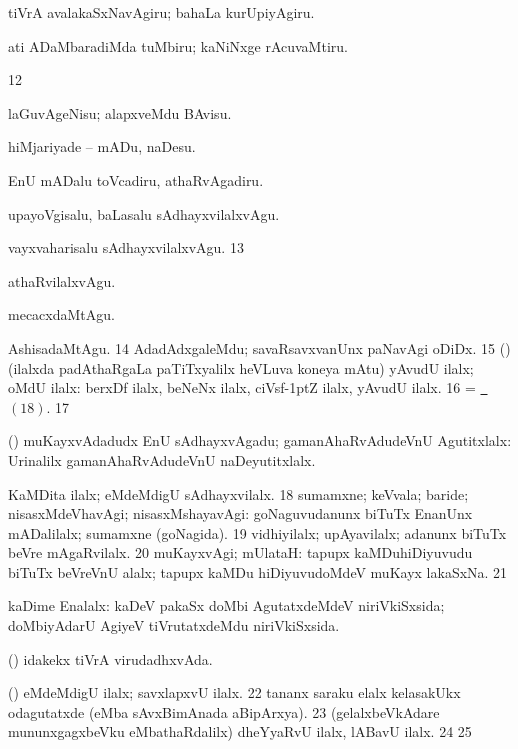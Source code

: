 { tiVrA avalakaSxNavAgiru; bahaLa kurUpiyAgiru.

 ati ADaMbaradiMda tuMbiru; kaNiNxge rAcuvaMtiru.

\num{12} 

 laGuvAgeNisu; alapxveMdu BAvisu.

 hiMjariyade -- mADu, naDesu.

 EnU mADalu toVcadiru, athaRvAgadiru.

 upayoVgisalu, baLasalu sAdhayxvilalxvAgu.

 vayxvaharisalu sAdhayxvilalxvAgu.
\num{13} 

 athaRvilalxvAgu.

 mecacxdaMtAgu.

 AshisadaMtAgu.
\num{14}  AdadAdxgaleMdu; savaRsavxvanUnx paNavAgi oDiDx.
\num{15} (\AmA) (ilalxda padAthaRgaLa paTiTxyalilx heVLuva koneya mAtu)
yAvudU ilalx; oMdU ilalx: berxDf ilalx,
beNeNx ilalx, ciVsf\kern -1ptZ ilalx, yAvudU ilalx.
\num{16}  = \hyperlink{nothingpagu18}{\pagu\ $(18)$}.
\num{17} 

 (\AmA) muKayxvAdadudx EnU sAdhayxvAgadu; gamanAhaRvAdudeVnU Agutitxlalx:
 Urinalilx gamanAhaRvAdudeVnU naDeyutitxlalx.

 KaMDita ilalx; eMdeMdigU sAdhayxvilalx.
\hypertarget{nothingpagu18}{}
\num{18}  sumamxne; keVvala; baride; nisasxMdeVhavAgi;
nisasxMshayavAgi:  goNaguvudanunx biTuTx EnanUnx mADalilalx;
sumamxne (goNagida).
\num{19}  vidhiyilalx; upAyavilalx; adanunx biTuTx beVre
mAgaRvilalx.
\num{20}  muKayxvAgi; mUlataH: 
 tapupx kaMDuhiDiyuvudu biTuTx beVreVnU alalx; tapupx kaMDu hiDiyuvudoMdeV muKayx lakaSxNa.
\num{21} 

 kaDime Enalalx:  kaDeV pakaSx doMbi
AgutatxdeMdeV niriVkiSxsida; doMbiyAdarU AgiyeV tiVrutatxdeMdu niriVkiSxsida.

 (\viparx) idakekx tiVrA virudadhxvAda.

 (\viparx) eMdeMdigU ilalx; savxlapxvU ilalx.
\num{22}  tananx saraku elalx kelasakUkx odagutatxde (eMba
sAvxBimAnada aBipArxya).
\num{23} (gelalxbeVkAdare mununxgagxbeVku eMbathaRdalilx)
dheYyaRvU ilalx, lABavU ilalx.
\num{24} 
\num{25} 

}
